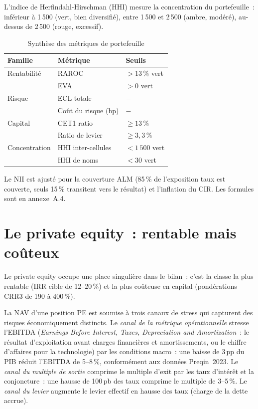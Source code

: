 \documentclass[10pt, a4paper, oneside]{report}
\theoremstyle{definition}
\begin{document}
L'indice de Herfindahl-Hirschman (HHI) mesure la concentration du portefeuille~: inférieur à 1\,500 (vert, bien diversifié), entre 1\,500 et 2\,500 (ambre, modéré), au-dessus de 2\,500 (rouge, excessif).

\begin{table}[htbp]
\centering
\caption{Synthèse des métriques de portefeuille}
\label{tab:metriques-synthese}
\small
\begin{tabular}{lll}
\toprule
Famille & Métrique & Seuils \\
\midrule
Rentabilité & RAROC & $> 13\,\%$ vert \\
 & EVA & $> 0$ vert \\
\midrule
Risque & ECL totale & $-$ \\
 & Coût du risque (bp) & $-$ \\
\midrule
Capital & CET1 ratio & $\geq 13\,\%$ \\
 & Ratio de levier & $\geq 3{,}3\,\%$ \\
\midrule
Concentration & HHI inter-cellules & $< 1\,500$ vert \\
 & HHI de noms & $< 30$ vert \\
\bottomrule
\end{tabular}
\end{table}

Le NII est ajusté pour la couverture ALM (85\,\% de l'exposition taux est couverte, seuls 15\,\% transitent vers le résultat) et l'inflation du CIR. Les formules sont en annexe~A.4.


\section{Le private equity~: rentable mais coûteux}
\label{sec:ch2:pe}

Le private equity occupe une place singulière dans le bilan~: c'est la classe la plus rentable (IRR cible de 12--20\,\%) et la plus coûteuse en capital (pondérations CRR3 de 190 à 400\,\%).

La NAV d'une position PE est soumise à trois canaux de stress qui capturent des risques économiquement distincts.
Le \emph{canal de la métrique opérationnelle} stresse l'EBITDA (\emph{Earnings Before Interest, Taxes, Depreciation and Amortization}~: le résultat d'exploitation avant charges financières et amortissements, ou le chiffre d'affaires pour la technologie) par les conditions macro~: une baisse de 3\,pp du PIB réduit l'EBITDA de 5--8\,\%, conformément aux données Preqin~2023.
Le \emph{canal du multiple de sortie} comprime le multiple d'exit par les taux d'intérêt et la conjoncture~: une hausse de 100\,pb des taux comprime le multiple de 3--5\,\%.
Le \emph{canal du levier} augmente le levier effectif en hausse des taux (charge de la dette accrue).
\end{document}
